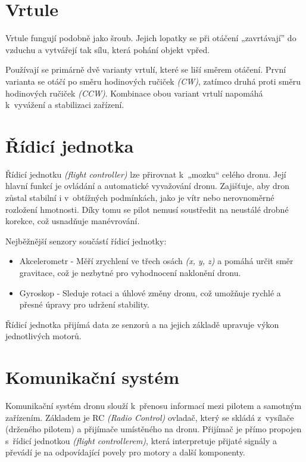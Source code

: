 \documentclass[12pt]{report}
\begin{document}
\section[Vrtule]{Vrtule}

Vrtule fungují podobně jako šroub. Jejich lopatky se při otáčení „zavrtávají” do vzduchu a vytvářejí tak sílu, která pohání objekt vpřed.

Používají se primárně dvě varianty vrtulí, které se liší směrem otáčení. První varianta se otáčí po směru hodinových ručiček \textit{(CW)}, zatímco druhá proti směru hodinových ručiček \textit{(CCW)}. Kombinace obou variant vrtulí napomáhá k~vyvážení a stabilizaci zařízení. \cite{mainbook} \cite{dojo}

\section[Řídicí jednotka]{Řídicí jednotka}

Řídicí jednotku \textit{(flight controller)} lze přirovnat k~„mozku“ celého dronu. Její hlavní funkcí je ovládání a automatické vyvažování dronu. Zajišťuje, aby dron zůstal stabilní i v~obtížných podmínkách, jako je vítr nebo nerovnoměrné rozložení hmotnosti. Díky tomu se pilot nemusí soustředit na neustálé drobné korekce, což usnadňuje manévrování.

Nejběžnější senzory součástí řídicí jednotky:
\begin{itemize}
	\item Akcelerometr -  Měří zrychlení ve třech osách \textit{(x, y, z)} a pomáhá určit směr gravitace, což je nezbytné pro vyhodnocení naklonění dronu.
	\item Gyroskop - Sleduje rotaci a úhlové změny dronu, což umožňuje rychlé a přesné úpravy pro udržení stability.
\end{itemize}

Řídicí jednotka přijímá data ze senzorů a na jejich základě upravuje výkon jednotlivých motorů. \cite{mainbook}

\section[Komunikační systém]{Komunikační systém}
Komunikační systém dronu slouží k~přenosu informací mezi pilotem a samotným zařízením. Základem je RC \textit{(Radio Control)} ovladač, který se skládá z~vysílače (drženého pilotem) a přijímače umístěného na dronu. Přijímač je přímo propojen s~řídicí jednotkou \textit{(flight controllerem)}, která interpretuje přijaté signály a převádí je na odpovídající povely pro motory a další komponenty.
\end{document}
